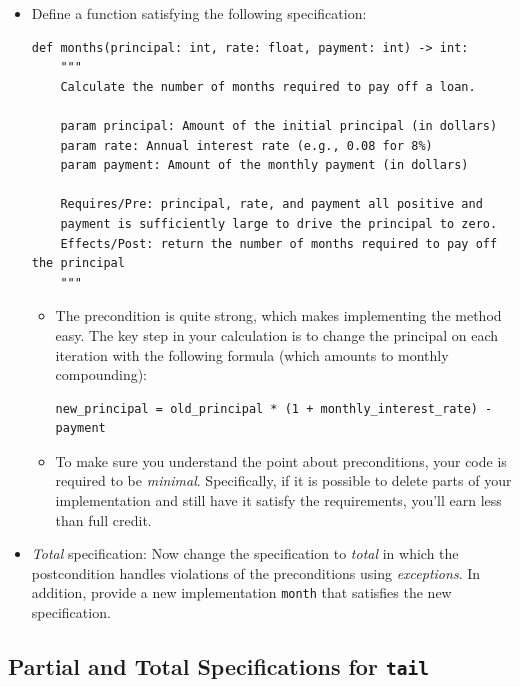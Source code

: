 \documentclass[oneside,11pt,dvipsnames]{book}
\newcommand{\code}[1]{\texttt{#1}}
\begin{document}
\begin{itemize}


\item Define a function satisfying the following specification:

\begin{lstlisting}
def months(principal: int, rate: float, payment: int) -> int:
    """
    Calculate the number of months required to pay off a loan.
    
    param principal: Amount of the initial principal (in dollars)
    param rate: Annual interest rate (e.g., 0.08 for 8%)
    param payment: Amount of the monthly payment (in dollars)
    
    Requires/Pre: principal, rate, and payment all positive and 
    payment is sufficiently large to drive the principal to zero.
    Effects/Post: return the number of months required to pay off the principal
    """
\end{lstlisting}

\begin{itemize}
    \item The precondition is quite strong, which makes implementing the method easy. The key step in your calculation is to change the principal on each iteration with the following formula (which amounts to monthly compounding):
    \begin{lstlisting}
new_principal = old_principal * (1 + monthly_interest_rate) - payment
    \end{lstlisting}

    \item To make sure you understand the point about preconditions, your code is required to be \emph{minimal}. Specifically, if it is possible to delete parts of your implementation and still have it satisfy the requirements, you'll earn less than full credit.
\end{itemize}
\item \emph{Total} specification: Now change the specification to \emph{total} in which the postcondition handles violations of the preconditions using \emph{exceptions}. In addition, provide a new implementation \code{month} that satisfies the new specification.
\end{itemize}


\subsection{Partial and Total Specifications for \code{tail}}\label{exercise:tail}
\end{document}
